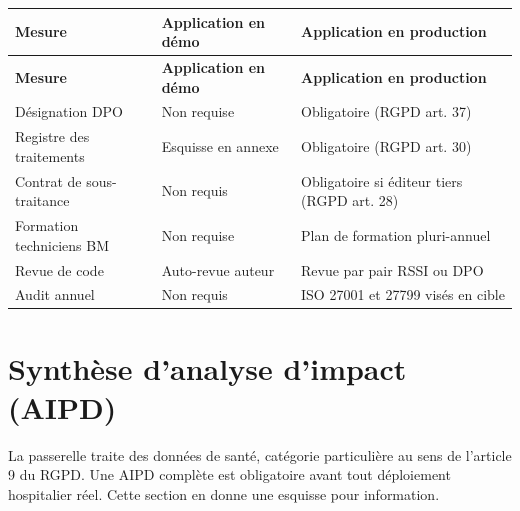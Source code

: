 \bridgezebra
\begin{longtable}{p{4cm}p{4.5cm}p{5.5cm}}
  \toprule
  \rowcolor{bridgeblue!90}
  {\color{white}\bfseries Mesure} & {\color{white}\bfseries Application en démo} & {\color{white}\bfseries Application en production} \\
  \midrule
  \endfirsthead
  \toprule
  \rowcolor{bridgeblue!90}
  {\color{white}\bfseries Mesure} & {\color{white}\bfseries Application en démo} & {\color{white}\bfseries Application en production} \\
  \midrule
  \endhead
  \bottomrule
  \endfoot
  Désignation DPO          & Non requise         & Obligatoire (RGPD art. 37) \\
  Registre des traitements & Esquisse en annexe  & Obligatoire (RGPD art. 30) \\
  Contrat de sous-traitance & Non requis         & Obligatoire si éditeur tiers (RGPD art. 28) \\
  Formation techniciens BM & Non requise         & Plan de formation pluri-annuel \\
  Revue de code            & Auto-revue auteur   & Revue par pair RSSI ou DPO \\
  Audit annuel             & Non requis          & ISO 27001 et 27799 visés en cible \\
\end{longtable}

\section{Synthèse d'analyse d'impact (AIPD)}
\label{sec:securite-aipd}

La passerelle traite des données de santé, catégorie particulière au sens de l'article 9 du RGPD. Une AIPD complète est obligatoire avant tout déploiement hospitalier réel. Cette section en donne une esquisse pour information.

